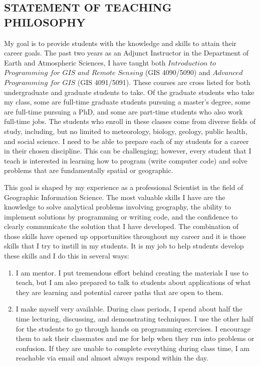 \documentclass{res}
\begin{document}
\begin{resume}
\section{STATEMENT OF TEACHING PHILOSOPHY}
\setlength{\parindent}{1cm} %
\noindent
\newline
My goal is to provide students with the knowledge and skills to attain their career goals. The past two years as an Adjunct Instructor in the Department of Earth and Atmospheric Sciences, I have taught both $Introduction$ $to$ $Programming$ $for$ $GIS$ $and$ $Remote$ $Sensing$ (GIS 4090/5090) and $Advanced$ $Programming$ $for$ $GIS$ (GIS 4091/5091). These courses are cross listed for both undergraduate and graduate students to take. Of the graduate students who take my class, some are full-time graduate students pursuing a master’s degree, some are full-time pursuing a PhD, and some are part-time students who also work full-time jobs. The students who enroll in these classes come from diverse fields of study, including, but no limited to meteorology, biology, geology, public health, and social science. I need to be able to prepare each of my students for a career in their chosen discipline. This can be challenging; however, every student that I teach is interested in learning how to program (write computer code) and solve problems that are fundamentally spatial or geographic.
\par This goal is shaped by my experience as a professional Scientist in the field of Geographic Information Science. The most valuable skills I have are the knowledge to solve analytical problems involving geography, the ability to implement solutions by programming or writing code, and the confidence to clearly communicate the solution that I have developed. The combination of those skills have opened up opportunities throughout my career and it is those skills that I try to instill in my students. It is my job to help students develop these skills and I do this in several ways:
\newline
\begin{enumerate}
\item I am mentor. I put tremendous effort behind creating the materials I use to teach, but I am also prepared to talk to students about applications of what they are learning and potential career paths that are open to them. 
\item I make myself very available. During class periods, I spend about half the time lecturing, discussing, and demonstrating techniques. I use the other half for the students to go through hands on programming exercises. I encourage them to ask their classmates and me for help when they run into problems or confusion. If they are unable to complete everything during class time, I am reachable via email and almost always respond within the day.

\end{enumerate}
\end{resume}
\end{document}
